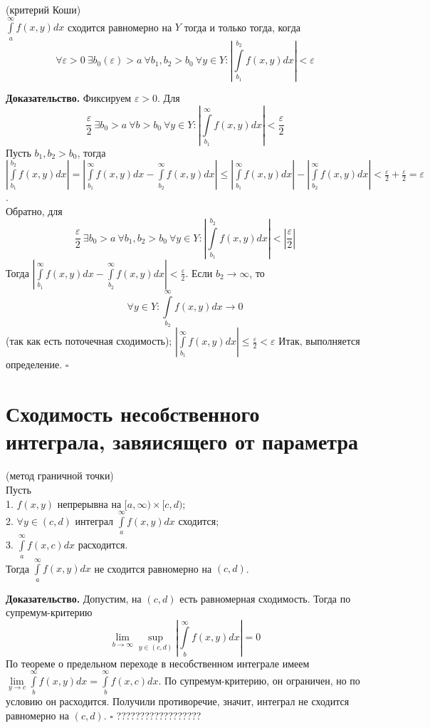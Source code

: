 \begin{theor}(критерий Коши)\\
    $\int\limits_{a}^{\infty}f(x,y)dx$ сходится равномерно на $Y$ тогда и 
    только тогда, когда 
     $$\forall \varepsilon>0~\exists b_0(\varepsilon)>a~\forall b_1,b_2>b_0~
 \forall y\in Y:\left|\int\limits_{b_1}^{b_2}f(x,y)dx\right|<\varepsilon$$
\end{theor}
\textbf{Доказательство.}  Фиксируем $\varepsilon>0$. Для 
$$\frac{\varepsilon}{2}~\exists b_0>a~\forall b>b_0~\forall y\in Y:
\left|\int\limits_{b_1}^{\infty}f(x,y)dx\right|<
\frac{\varepsilon}{2}$$
Пусть $b_1,b_2>b_0$, тогда $\left| \int\limits_{b_1}^{b_2}f(x,y)dx\right|=
\left|\int\limits_{b_1}^{\infty}f(x,y)dx-\int\limits_{b_2}^{\infty} f(x,y)dx
\right|\leqslant 
\left|\int\limits_{b_1}^{\infty}f(x,y)dx\right|
-\left|\int\limits_{b_2}^{\infty} f(x,y)dx\right|<
\frac{\varepsilon}{2}+\frac{\varepsilon}{2}=\varepsilon$.\\
Обратно, для
$$\frac{\varepsilon}{2}~\exists b_0>a~\forall b_1,b_2>b_0~\forall y\in Y:
\left|\int\limits_{b_1}^{b_2}f(x,y)dx\right|<
\left|\frac{\varepsilon}{2}\right|$$
Тогда 
$\left|\int\limits_{b_1}^{\infty}f(x,y)dx-\int\limits_{b_2}^{\infty} f(x,y)dx
\right|<\frac{\varepsilon}{2}$. Если $b_2\to \infty$, то
$$\forall y\in Y: \int\limits_{b_2}^{\infty}f(x,y)dx\to 0$$ 
(так как есть поточечная сходимость);
$\left|\int\limits_{b_1}^{\infty}f(x,y)dx\right|\leqslant\frac{\varepsilon}{2}
<\varepsilon$
Итак, выполняется определение. $\square$ \\
\section{Сходимость несобственного интеграла, завяисящего от параметра}
\begin{theor}
    (метод граничной точки)\\
    Пусть\\
    1. $f(x,y)$ непрерывна на $[a,\infty)\times[c,d)$;\\
    2. $\forall y\in (c,d)$ интеграл $\int\limits_{a}^{\infty} f(x,y)dx$ 
    сходится; \\
    3. $\int\limits_{a}^{\infty}f(x,c)dx$ расходится.\\
    Тогда $\int\limits_{a}^{\infty}f(x,y)dx$ не сходится равномерно на 
    $(c,d)$.
\end{theor}
\textbf{Доказательство.} Допустим, на $(c,d)$ есть равномерная сходимость.
Тогда по супремум-критерию
$$\lim\limits_{b \to \infty}\sup\limits_{y\in (c,d)}
\left| \int\limits_{b}^{\infty}f(x,y)dx\right|=0$$
По теореме о предельном переходе в несобственном интеграле 
имеем $\lim\limits_{y \to c}\int\limits_{b}^{\infty}f(x,y)dx=
\int\limits_{b}^{\infty}f(x,c)dx$. По супремум-критерию, он ограничен, но 
по условию он расходится. Получили противоречие, значит, интеграл не сходится
равномерно на $(c,d)$. $\square$ ??????????????????

